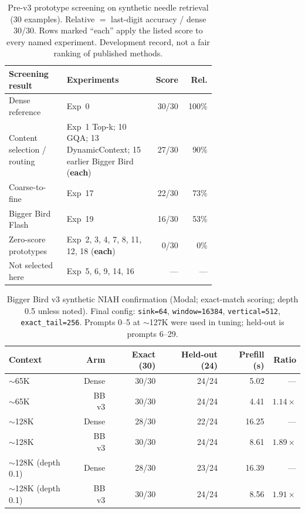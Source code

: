 \documentclass[11pt]{article}
\begin{document}
\begin{table}[ht]
  \centering
  \small
  \caption{Pre-v3 prototype screening on synthetic needle retrieval
  (30 examples). Relative $=$ last-digit accuracy / dense 30/30. Rows marked
  ``each'' apply the listed score to every named experiment. Development
  record, not a fair ranking of published methods.}
  \label{tab:screening}
  \begin{tabular}{@{}>{\raggedright\arraybackslash}p{0.28\linewidth}
                >{\raggedright\arraybackslash}p{0.42\linewidth}rr@{}}
    \toprule
    Screening result & Experiments & Score & Rel. \\
    \midrule
    Dense reference
      & Exp~0
      & 30/30 & 100\% \\
    Content selection / routing
      & Exp~1 Top-k; 10 GQA; 13 DynamicContext; 15 earlier Bigger Bird (\textbf{each})
      & 27/30 & 90\% \\
    Coarse-to-fine
      & Exp~17
      & 22/30 & 73\% \\
    Bigger Bird Flash
      & Exp~19
      & 16/30 & 53\% \\
    Zero-score prototypes
      & Exp~2, 3, 4, 7, 8, 11, 12, 18 (\textbf{each})
      & 0/30 & 0\% \\
    Not selected here
      & Exp~5, 6, 9, 14, 16
      & --- & --- \\
    \bottomrule
  \end{tabular}
\end{table}

\begin{table}[ht]
  \centering
  \small
  \caption{Bigger Bird v3 synthetic NIAH confirmation (Modal; exact-match
  scoring; depth 0.5 unless noted). Final config:
  \texttt{sink=64}, \texttt{window=16384}, \texttt{vertical=512},
  \texttt{exact\_tail=256}. Prompts 0--5 at $\sim$127K were used in tuning;
  held-out is prompts 6--29.}
  \label{tab:v3-niah}
  \begin{tabular}{@{}lrrrrr@{}}
    \toprule
    Context & Arm & Exact (30) & Held-out (24) & Prefill (s) & Ratio \\
    \midrule
    $\sim$65K  & Dense & 30/30 & 24/24 & 5.02 & --- \\
    $\sim$65K  & BB v3 & 30/30 & 24/24 & 4.41 & $1.14\times$ \\
    $\sim$128K & Dense & 28/30 & 22/24 & 16.25 & --- \\
    $\sim$128K & BB v3 & 30/30 & 24/24 & 8.61 & $1.89\times$ \\
    $\sim$128K (depth 0.1) & Dense & 28/30 & 23/24 & 16.39 & --- \\
    $\sim$128K (depth 0.1) & BB v3 & 30/30 & 24/24 & 8.56 & $1.91\times$ \\
    \bottomrule
  \end{tabular}
\end{table}
\end{document}
